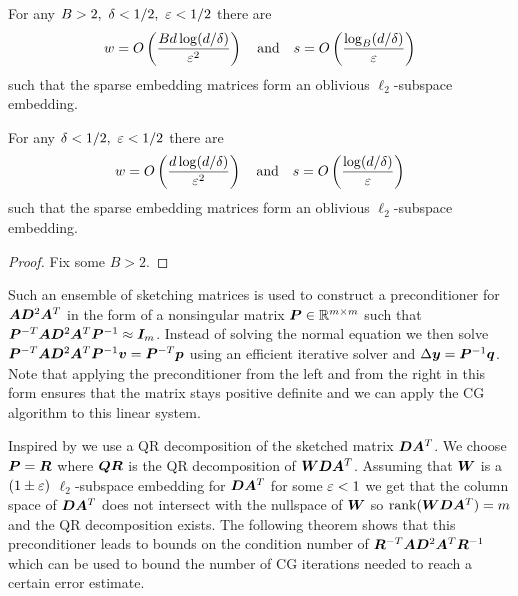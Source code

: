 \begin{theorem}  \label{thm:sparse-ose}
For any \(B > 2, \ \delta < 1/2, \ \varepsilon < 1/2\) there are
\[ w = O \left( \frac{B d \log(d/\delta)}{\varepsilon^2} \right) \quad \text{and} \quad s = O \left( \frac{\log_B(d/\delta)}{\varepsilon} \right)\]
such that the sparse embedding matrices form an oblivious \(\ell_2\)-subspace embedding.
\end{theorem}

\begin{corollary}
For any \(\delta < 1/2, \ \varepsilon < 1/2\) there are
\[ w = O \left( \frac{d \log(d/\delta)}{\varepsilon^2} \right) \quad \text{and} \quad s = O \left( \frac{\log(d/\delta)}{\varepsilon} \right)\]
such that the sparse embedding matrices form an oblivious \(\ell_2\)-subspace embedding.
\end{corollary}
\begin{proof}
Fix some \(B > 2\).
\end{proof}

Such an ensemble of sketching matrices is used to construct a preconditioner for \(\bm{A} \bm{D}^2 \bm{A}^T\) in the form of a nonsingular matrix \(\bm{P} \in \mathbb{R}^{m \times m}\) such that
\( \bm{P}^{-T} \bm{A} \bm{D}^2 \bm{A}^T \bm{P}^{-1} \approx \bm{I}_m \).
Instead of solving the normal equation we then solve
\( \bm{P}^{-T} \bm{A} \bm{D}^2 \bm{A}^T \bm{P}^{-1} \bm{v} = \bm{P}^{-T} \bm{p} \)
using an efficient iterative solver and \(\Delta\bm{y} = \bm{P}^{-1} \bm{q}\).
Note that applying the preconditioner from the left and from the right in this form ensures that the matrix stays positive definite and we can apply the CG algorithm to this linear system.

Inspired by \textcite{Avron-FasterRandomizedInfeasibleIPMs} we use a QR decomposition of the sketched matrix \(\bm{D}\bm{A}^T\).
We choose \(\bm{P} = \bm{R}\) where \(\bm{Q}\bm{R}\) is the QR decomposition of \(\bm{W}\bm{D}\bm{A}^T\).
Assuming that \(\bm{W}\) is a \((1\pm\varepsilon)\) \(\ell_2\)-subspace embedding for \(\bm{D}\bm{A}^T\) for some \(\varepsilon < 1\) we get that the column space of \(\bm{D}\bm{A}^T\) does not intersect with the nullspace of \(\bm{W}\) so \(\operatorname{rank}(\bm{W}\bm{D}\bm{A}^T) = m\) and the QR decomposition exists.
The following theorem shows that this preconditioner leads to bounds on the condition number of \(\bm{R}^{-T} \bm{A} \bm{D}^2 \bm{A}^T \bm{R}^{-1}\) which can be used to bound the number of CG iterations needed to reach a certain error estimate.

